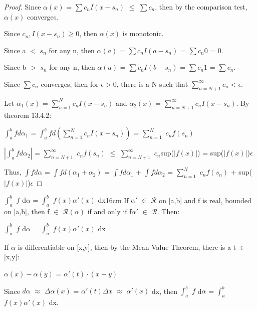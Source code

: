     \begin{proof}
        Since $\alpha(x)$ = $\sum c_n I(x-s_n)$ $\leq$ $\sum c_n$, then
        by the comparison test, $\alpha(x)$ converges.

        Since $c_n,I(x-s_n) \geq 0$, then $\alpha(x)$ is monotonic.

        Since a $<$ $s_n$ for any n, then
        $\alpha(a)$ = $\sum c_n I(a-s_n)$ = $\sum c_n 0$ = 0.

        Since b $>$ $s_n$ for any n, then
        $\alpha(a)$ = $\sum c_n I(b-s_n)$ = $\sum c_n 1$ = $\sum c_n$.

        Since $\sum c_n$ converges, then for $\epsilon > 0$, there is a N
        such that $\sum_{n=N+1}^{\infty} c_n < \epsilon$.

        Let $\alpha_1(x)$ = $\sum_{n=1}^N c_n I(x-s_n)$
        and $\alpha_2(x)$ = $\sum_{n=N+1}^{\infty} c_n I(x-s_n)$.
        By {\color{red} theorem 13.4.2}:
        
        \hspace{0.5cm}
        $\int_a^b f d\alpha_1$
        = $\int_a^b f d(\sum_{n=1}^N c_n I(x-s_n))$
        = $\sum_{n=1}^N$ $c_n f(s_n)$

        \hspace{0.5cm}
        $|\int_a^b f d\alpha_2|$
        = $\sum_{n=N+1}^{\infty}$ $c_n f(s_n)$
        $\leq$ $\sum_{n=N+1}^{\infty}$ $c_n$sup($|f(x)|$)
        = sup($|f(x)|$)$\epsilon$

        Thus, $\int f d\alpha$
        = $\int f d(\alpha_1+\alpha_2)$
        = $\int f d\alpha_1$ + $\int f d\alpha_2$
        = $\sum_{n=1}^N$ $c_n f(s_n)$ + sup($|f(x)|$)$\epsilon$    
    \end{proof}

    \vspace{0.5cm}



    \begin{wtheorem}{$\int_a^b$ $f$ d$\alpha$
    = $\int_a^b$ $f(x) \alpha'(x)$ dx}{16cm}
        If $\alpha'$ $\in$ $\mathscr{R}$ on [a,b] and
        f is real, bounded on [a,b], then f $\in$ $\mathscr{R}(\alpha)$
        if and only if f$\alpha'$ $\in$ $\mathscr{R}$. Then:

        \hspace{0.5cm}
        $\int_a^b$ $f$ d$\alpha$ = $\int_a^b$ $f(x) \alpha'(x)$ dx        
    \end{wtheorem}

    \begin{intuition}
        If $\alpha$ is differentiable on [x,y], then by the Mean Value Theorem,
        there is a t $\in$ [x,y]:

        \hspace{0.5cm}
        $\alpha(x) - \alpha(y)$ = $\alpha'(t) \cdot (x-y)$

        Since
        $d\alpha$
        $\approx$ $\Delta \alpha(x)$
        = $\alpha'(t) \Delta x$
        $\approx$ $\alpha'(x)$ dx,
        then $\int_a^b$ $f$ d$\alpha$ = $\int_a^b$ $f(x) \alpha'(x)$ dx.
    \end{intuition}

